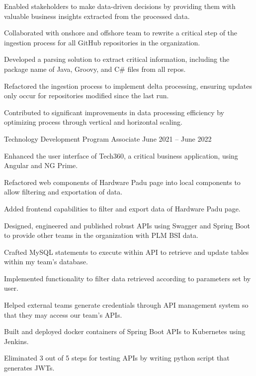 \begin{cventries}
{\begin{cvitems}
        \item {Enabled stakeholders to make data-driven decisions by providing them with valuable business insights extracted from the processed data.}
        \item {Collaborated with onshore and offshore team to rewrite a critical step of the ingestion process for all GitHub repositories in the organization.}
        \item {Developed a parsing solution to extract critical information, including the package name of Java, Groovy, and C\# files from all repos.}
        \item {Refactored the ingestion process to implement delta processing, ensuring updates only occur for repositories modified since the last run.}
        \item {Contributed to significant improvements in data processing efficiency by optimizing process through vertical and horizontal scaling.}
      \end{cvitems}
    }
  \cventry
    {Technology Development Program Associate} %
    {} %
    {} %
    {June 2021 – June 2022} %
    {
      \begin{cvitems} %
        \item {Enhanced the user interface of Tech360, a critical business application, using Angular and NG Prime.}
        \item {Refactored web components of Hardware Padu page into local components to allow filtering and exportation of data.}
        \item {Added frontend capabilities to filter and export data of Hardware Padu page.}
        \item {Designed, engineered and published robust APIs using Swagger and Spring Boot to provide other teams in the organization with PLM BSI data.}
        \item {Crafted MySQL statements to execute within API to retrieve and update tables within my team's database.}
        \item {Implemented functionality to filter data retrieved according to parameters set by user.}
        \item {Helped external teams generate credentials through API management system so that they may access our team's APIs.}
        \item {Built and deployed docker containers of Spring Boot APIs to Kubernetes using Jenkins.}
        \item {Eliminated 3 out of 5 steps for testing APIs by writing python script that generates JWTs.}
      \end{cvitems}
    }

\end{cventries}
